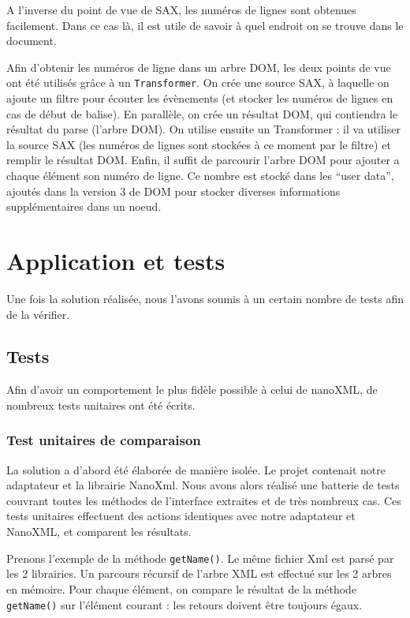 A l'inverse du point de vue de SAX, les numéros de lignes sont obtenues facilement. Dans ce cas là, il est utile de savoir à quel endroit on se trouve dans le document.

Afin d'obtenir les numéros de ligne dans un arbre DOM, les deux points de vue ont été utilisés grâce à un \verb|Transformer|.
On crée une source SAX, à laquelle on ajoute un filtre pour écouter les évènements (et stocker les numéros de lignes en cas de début de balise).
En parallèle, on crée un résultat DOM, qui contiendra le résultat du parse (l'arbre DOM).
On utilise ensuite un Transformer : il va utiliser la source SAX (les numéros de lignes sont stockées à ce moment par le filtre) et remplir le résultat DOM.
Enfin, il suffit de parcourir l'arbre DOM pour ajouter a chaque élément son numéro de ligne.
Ce nombre est stocké dans les ``user data'', ajoutés dans la version 3  de DOM pour stocker diverses informations supplémentaires dans un noeud.


\section{Application et tests}
Une fois la solution réalisée, nous l'avons soumis à un certain nombre de tests afin de la vérifier.
\subsection{Tests}
Afin d'avoir un comportement le plus fidèle possible à celui de nanoXML, de nombreux tests unitaires ont été écrits.
\subsubsection{Test unitaires de comparaison}
La solution a d'abord été élaborée de manière isolée. Le projet contenait notre adaptateur et la librairie NanoXml.
Nous avons alors réalisé une batterie de tests couvrant toutes les méthodes de l'interface extraites et de très nombreux cas.
Ces tests unitaires effectuent des actions identiques avec notre adaptateur et NanoXML, et comparent les résultats. 

Prenons l'exemple de la méthode \verb|getName()|. Le même fichier Xml est parsé par les 2 librairies.
Un parcours récursif de l'arbre XML est effectué sur les 2 arbres en mémoire.
Pour chaque élément, on compare le résultat de la méthode \verb|getName()| sur l'élément courant : les retours doivent être toujours égaux.

